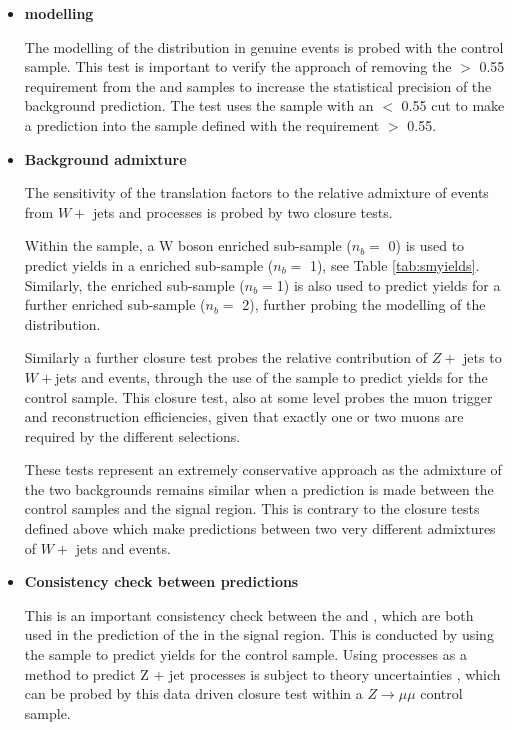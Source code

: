 \begin{itemize}

\item[] \textbf{\alphat modelling}

The modelling of the \alphat distribution in genuine \met events is probed with the \mupjets control sample. This test is important to verify the approach of removing the \alphat $>$ 0.55 requirement from the \mupjets and \dimupjets samples to increase the statistical precision of the background prediction. The test uses the \mupjets sample with an \alphat $<$ 0.55 cut to make a prediction into the \mupjets sample defined with the requirement  \alphat $>$ 0.55.

\item[] \textbf{Background admixture}

The sensitivity of the translation factors to the relative admixture of events from $W +$ jets and \ttbar processes is probed by two closure tests. 

Within the \mupjets sample, a W boson enriched sub-sample ($n_{b} =$ 0) is used to predict yields in a \ttbar enriched sub-sample ($n_{b} =$ 1), see Table \ref{tab:smyields}. Similarly, the \ttbar enriched sub-sample ($n_{b} =$1) is also used to predict yields for a further enriched \ttbar sub-sample ($n_{b} =$ 2), further probing the modelling of the \nbreco distribution. 

Similarly a further closure test probes the relative contribution of $Z +$ jets to $W +$jets and \ttbar events, through the use of the \mupjets sample to predict yields for the \dimupjets control sample. This closure test, also at some level probes the muon trigger and reconstruction efficiencies, given that exactly one or two muons are required by the different selections.
 
These tests represent an extremely conservative approach as the admixture of the two backgrounds remains similar when a prediction is made between the control samples and the signal region. This is contrary to the closure tests defined above which make predictions between two very different admixtures of $W +$ jets and \ttbar events.  

\item[] \textbf{Consistency check between \zinv predictions}

This is an important consistency check between the \dimupjets and \gpjets, which are both used in the prediction of the \zinv in the signal region. This is conducted by using the \gpjets sample to predict yields for the \dimupjets control sample. Using \gpjets processes as a method to predict Z + jet processes is subject to theory uncertainties \cite{CMS-PAS-SUS-08-002}, which can be probed by this data driven closure test within a $Z \rightarrow \mu\mu$ control sample. 


\end{itemize}
